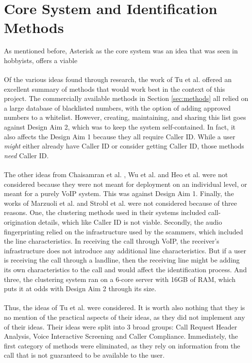 \documentclass[main.tex]{subfiles}
\begin{document}
\section{Core System and Identification Methods}
As mentioned before, Asterisk as the core system was an idea that was seen in hobbyists, offers a viable
\\\\
Of the various ideas found through research, the work of Tu et al. \cite{cisco} offered an excellent summary of methods that would work best in the context of this project. The commercially available methods in Section \ref{sec:methods} all relied on a large database of blacklisted numbers, with the option of adding approved numbers to a whitelist. However, creating, maintaining, and sharing this list goes against Design Aim 2, which was to keep the system self-contained. In fact, it also affects the Design Aim 1 because they all require Caller ID. While a user \textit{might} either already have Caller ID or consider getting Caller ID, those methods \textit{need} Caller ID.
\\\\
The other ideas from Chaisamran et al. \cite{chaisa}, Wu et al. \cite{wu} and Heo et al. \cite{heo} were not considered because they were not meant for deployment on an individual level, or meant for a purely VoIP system. This was against Design Aim 1. Finally, the works of Marzuoli et al. \cite{marzuoli} and Strobl et al. \cite{strobl} were not considered because of three reasons. One, the clustering methods used in their systems included call-origination details, which like Caller ID is not viable. Secondly, the audio fingerprinting relied on the infrastructure used by the scammers, which included the line characteristics. In receiving the call through VoIP, the receiver's infrastructure does not introduce any additional line characteristics. But if a user is receiving the call through a landline, then the receiving line might be adding its own characteristics to the call and would affect the identification process. And three, the clustering system ran on a 6-core server with 16GB of RAM, which puts it at odds with Design Aim 2 through its size.
\\\\
Thus, the ideas of Tu et al. \cite{cisco} were considered. It is worth also nothing that they is no mention of the practical aspects of their ideas, as they did not implement any of their ideas. Their ideas were split into 3 broad groups: Call Request Header Analysis, Voice Interactive Screening and Caller Compliance. Immediately, the first category of methods were eliminated, as they rely on information from the call that is not guaranteed to be available to the user.
\end{document}
